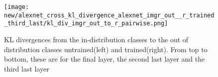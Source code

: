 \documentclass{article}
\begin{document}
\begin{figure}[H]
\begin{minipage}{0.45\textwidth}
                \end{minipage}\hfill
                \begin{minipage}{0.45\textwidth}
                    \centering
                    \texttt{[image: new/alexnet\_cross\_kl\_divergence\_alexnet\_imgr\_out\_\_r\_trained\_third\_last/kl\_div\_imgr\_out\_to\_r\_pairwise.png]}
                \end{minipage}
                \caption{KL divergences from the in-distribution classes to the out of distribution classes untrained(left) and trained(right). From top to bottom, these are for the final layer, the second last layer and the third last layer}
                \label{fig:cross_kl_divergence_a_to_b}
            
            \end{figure}
            
\end{document}
